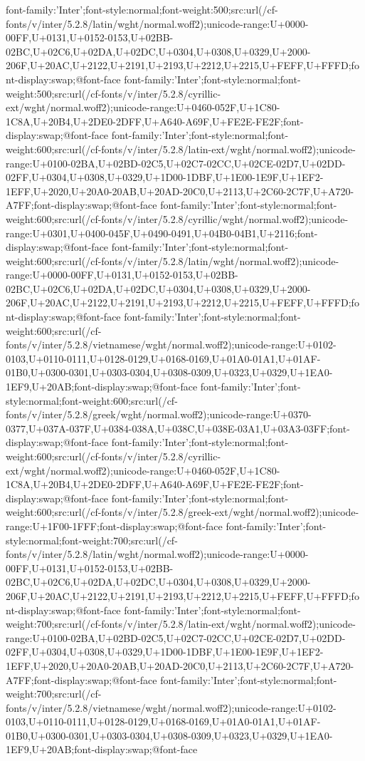 {font-family:'Inter';font-style:normal;font-weight:500;src:url(/cf-fonts/v/inter/5.2.8/latin/wght/normal.woff2);unicode-range:U+0000-00FF,U+0131,U+0152-0153,U+02BB-02BC,U+02C6,U+02DA,U+02DC,U+0304,U+0308,U+0329,U+2000-206F,U+20AC,U+2122,U+2191,U+2193,U+2212,U+2215,U+FEFF,U+FFFD;font-display:swap;}@font-face {font-family:'Inter';font-style:normal;font-weight:500;src:url(/cf-fonts/v/inter/5.2.8/cyrillic-ext/wght/normal.woff2);unicode-range:U+0460-052F,U+1C80-1C8A,U+20B4,U+2DE0-2DFF,U+A640-A69F,U+FE2E-FE2F;font-display:swap;}@font-face {font-family:'Inter';font-style:normal;font-weight:600;src:url(/cf-fonts/v/inter/5.2.8/latin-ext/wght/normal.woff2);unicode-range:U+0100-02BA,U+02BD-02C5,U+02C7-02CC,U+02CE-02D7,U+02DD-02FF,U+0304,U+0308,U+0329,U+1D00-1DBF,U+1E00-1E9F,U+1EF2-1EFF,U+2020,U+20A0-20AB,U+20AD-20C0,U+2113,U+2C60-2C7F,U+A720-A7FF;font-display:swap;}@font-face {font-family:'Inter';font-style:normal;font-weight:600;src:url(/cf-fonts/v/inter/5.2.8/cyrillic/wght/normal.woff2);unicode-range:U+0301,U+0400-045F,U+0490-0491,U+04B0-04B1,U+2116;font-display:swap;}@font-face {font-family:'Inter';font-style:normal;font-weight:600;src:url(/cf-fonts/v/inter/5.2.8/latin/wght/normal.woff2);unicode-range:U+0000-00FF,U+0131,U+0152-0153,U+02BB-02BC,U+02C6,U+02DA,U+02DC,U+0304,U+0308,U+0329,U+2000-206F,U+20AC,U+2122,U+2191,U+2193,U+2212,U+2215,U+FEFF,U+FFFD;font-display:swap;}@font-face {font-family:'Inter';font-style:normal;font-weight:600;src:url(/cf-fonts/v/inter/5.2.8/vietnamese/wght/normal.woff2);unicode-range:U+0102-0103,U+0110-0111,U+0128-0129,U+0168-0169,U+01A0-01A1,U+01AF-01B0,U+0300-0301,U+0303-0304,U+0308-0309,U+0323,U+0329,U+1EA0-1EF9,U+20AB;font-display:swap;}@font-face {font-family:'Inter';font-style:normal;font-weight:600;src:url(/cf-fonts/v/inter/5.2.8/greek/wght/normal.woff2);unicode-range:U+0370-0377,U+037A-037F,U+0384-038A,U+038C,U+038E-03A1,U+03A3-03FF;font-display:swap;}@font-face {font-family:'Inter';font-style:normal;font-weight:600;src:url(/cf-fonts/v/inter/5.2.8/cyrillic-ext/wght/normal.woff2);unicode-range:U+0460-052F,U+1C80-1C8A,U+20B4,U+2DE0-2DFF,U+A640-A69F,U+FE2E-FE2F;font-display:swap;}@font-face {font-family:'Inter';font-style:normal;font-weight:600;src:url(/cf-fonts/v/inter/5.2.8/greek-ext/wght/normal.woff2);unicode-range:U+1F00-1FFF;font-display:swap;}@font-face {font-family:'Inter';font-style:normal;font-weight:700;src:url(/cf-fonts/v/inter/5.2.8/latin/wght/normal.woff2);unicode-range:U+0000-00FF,U+0131,U+0152-0153,U+02BB-02BC,U+02C6,U+02DA,U+02DC,U+0304,U+0308,U+0329,U+2000-206F,U+20AC,U+2122,U+2191,U+2193,U+2212,U+2215,U+FEFF,U+FFFD;font-display:swap;}@font-face {font-family:'Inter';font-style:normal;font-weight:700;src:url(/cf-fonts/v/inter/5.2.8/latin-ext/wght/normal.woff2);unicode-range:U+0100-02BA,U+02BD-02C5,U+02C7-02CC,U+02CE-02D7,U+02DD-02FF,U+0304,U+0308,U+0329,U+1D00-1DBF,U+1E00-1E9F,U+1EF2-1EFF,U+2020,U+20A0-20AB,U+20AD-20C0,U+2113,U+2C60-2C7F,U+A720-A7FF;font-display:swap;}@font-face {font-family:'Inter';font-style:normal;font-weight:700;src:url(/cf-fonts/v/inter/5.2.8/vietnamese/wght/normal.woff2);unicode-range:U+0102-0103,U+0110-0111,U+0128-0129,U+0168-0169,U+01A0-01A1,U+01AF-01B0,U+0300-0301,U+0303-0304,U+0308-0309,U+0323,U+0329,U+1EA0-1EF9,U+20AB;font-display:swap;}@font-face 